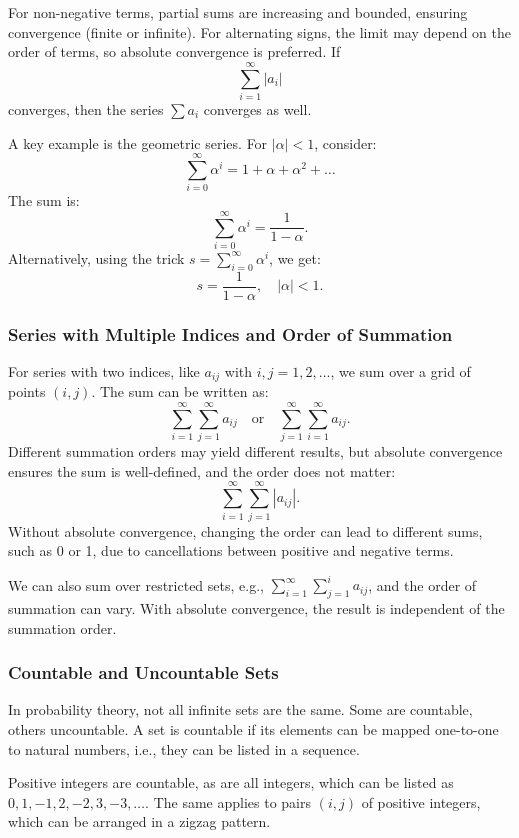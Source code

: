 For non-negative terms, partial sums are increasing and bounded, ensuring convergence (finite or infinite). For alternating signs, the limit may depend on the order of terms, so absolute convergence is preferred. If
\[
\sum_{i=1}^{\infty} |a_i|
\]
converges, then the series \(\sum a_i\) converges as well.

A key example is the geometric series. For \(|\alpha| < 1\), consider:
\[
\sum_{i=0}^{\infty} \alpha^i = 1 + \alpha + \alpha^2 + \dots
\]
The sum is:
\[
\sum_{i=0}^{\infty} \alpha^i = \frac{1}{1 - \alpha}.
\]
Alternatively, using the trick \(s = \sum_{i=0}^{\infty} \alpha^i\), we get:
\[
s = \frac{1}{1 - \alpha}, \quad |\alpha| < 1.
\]


\subsubsection{Series with Multiple Indices and Order of Summation}

For series with two indices, like \(a_{ij}\) with \(i,j = 1,2,\dots\), we sum over a grid of points \((i,j)\). The sum can be written as:
\[
\sum_{i=1}^{\infty} \sum_{j=1}^{\infty} a_{ij} \quad \text{or} \quad \sum_{j=1}^{\infty} \sum_{i=1}^{\infty} a_{ij}.
\]
Different summation orders may yield different results, but absolute convergence ensures the sum is well-defined, and the order does not matter:
\[
\sum_{i=1}^{\infty} \sum_{j=1}^{\infty} |a_{ij}|.
\]
Without absolute convergence, changing the order can lead to different sums, such as 0 or 1, due to cancellations between positive and negative terms.

We can also sum over restricted sets, e.g., \(\sum_{i=1}^{\infty} \sum_{j=1}^{i} a_{ij}\), and the order of summation can vary. With absolute convergence, the result is independent of the summation order.

\subsubsection{Countable and Uncountable Sets}

In probability theory, not all infinite sets are the same. Some are countable, others uncountable. A set is countable if its elements can be mapped one-to-one to natural numbers, i.e., they can be listed in a sequence.

Positive integers are countable, as are all integers, which can be listed as \(0, 1, -1, 2, -2, 3, -3, \dots\). The same applies to pairs \((i,j)\) of positive integers, which can be arranged in a zigzag pattern.

